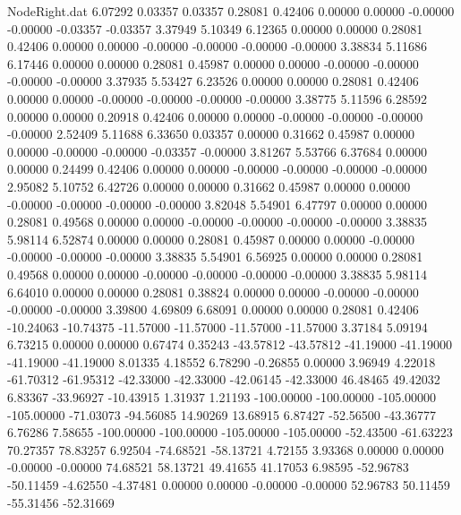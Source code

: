 \begin{filecontents}{NodeRight.dat}
   6.07292    0.03357    0.03357     0.28081    0.42406    0.00000    0.00000   -0.00000   -0.00000   -0.03357   -0.03357    3.37949    5.10349
   6.12365    0.00000    0.00000     0.28081    0.42406    0.00000    0.00000   -0.00000   -0.00000   -0.00000   -0.00000    3.38834    5.11686
   6.17446    0.00000    0.00000     0.28081    0.45987    0.00000    0.00000   -0.00000   -0.00000   -0.00000   -0.00000    3.37935    5.53427
   6.23526    0.00000    0.00000     0.28081    0.42406    0.00000    0.00000   -0.00000   -0.00000   -0.00000   -0.00000    3.38775    5.11596
   6.28592    0.00000    0.00000     0.20918    0.42406    0.00000    0.00000   -0.00000   -0.00000   -0.00000   -0.00000    2.52409    5.11688
   6.33650    0.03357    0.00000     0.31662    0.45987    0.00000    0.00000   -0.00000   -0.00000   -0.03357   -0.00000    3.81267    5.53766
   6.37684    0.00000    0.00000     0.24499    0.42406    0.00000    0.00000   -0.00000   -0.00000   -0.00000   -0.00000    2.95082    5.10752
   6.42726    0.00000    0.00000     0.31662    0.45987    0.00000    0.00000   -0.00000   -0.00000   -0.00000   -0.00000    3.82048    5.54901
   6.47797    0.00000    0.00000     0.28081    0.49568    0.00000    0.00000   -0.00000   -0.00000   -0.00000   -0.00000    3.38835    5.98114
   6.52874    0.00000    0.00000     0.28081    0.45987    0.00000    0.00000   -0.00000   -0.00000   -0.00000   -0.00000    3.38835    5.54901
   6.56925    0.00000    0.00000     0.28081    0.49568    0.00000    0.00000   -0.00000   -0.00000   -0.00000   -0.00000    3.38835    5.98114
   6.64010    0.00000    0.00000     0.28081    0.38824    0.00000    0.00000   -0.00000   -0.00000   -0.00000   -0.00000    3.39800    4.69809
   6.68091    0.00000    0.00000     0.28081    0.42406  -10.24063  -10.74375  -11.57000  -11.57000  -11.57000  -11.57000    3.37184    5.09194
   6.73215    0.00000    0.00000     0.67474    0.35243  -43.57812  -43.57812  -41.19000  -41.19000  -41.19000  -41.19000    8.01335    4.18552
   6.78290   -0.26855    0.00000     3.96949    4.22018  -61.70312  -61.95312  -42.33000  -42.33000  -42.06145  -42.33000   46.48465   49.42032
   6.83367  -33.96927  -10.43915     1.31937    1.21193 -100.00000 -100.00000 -105.00000 -105.00000  -71.03073  -94.56085   14.90269   13.68915
   6.87427  -52.56500  -43.36777     6.76286    7.58655 -100.00000 -100.00000 -105.00000 -105.00000  -52.43500  -61.63223   70.27357   78.83257
   6.92504  -74.68521  -58.13721     4.72155    3.93368    0.00000    0.00000   -0.00000   -0.00000   74.68521   58.13721   49.41655   41.17053
   6.98595  -52.96783  -50.11459    -4.62550   -4.37481    0.00000    0.00000   -0.00000   -0.00000   52.96783   50.11459  -55.31456  -52.31669

\end{filecontents}
